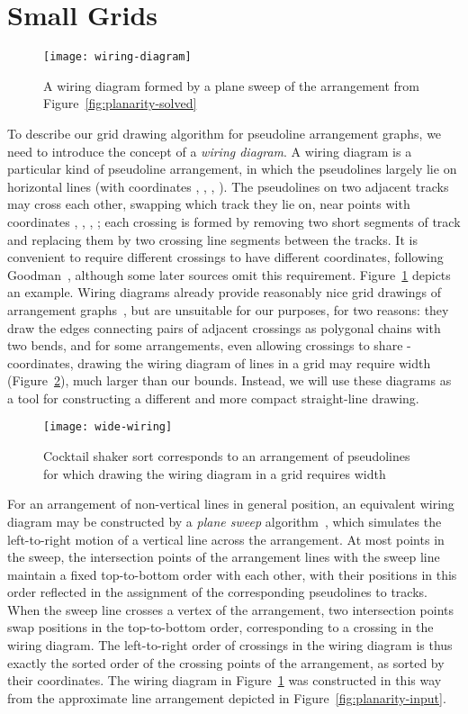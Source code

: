 \documentclass[oribibl]{llncs}
\begin{document}
\section{Small Grids}
\label{sec:grid}

\begin{figure}[b]
\centering\texttt{[image: wiring-diagram]}
\caption{A wiring diagram formed by a plane sweep of the arrangement from Figure~\ref{fig:planarity-solved}}
\label{fig:wiring-diagram}
\end{figure}

To describe our grid drawing algorithm for pseudoline arrangement graphs, we need to introduce the concept of a \emph{wiring diagram}. A wiring diagram is a particular kind of pseudoline arrangement, in which the  pseudolines largely lie on  horizontal lines (with coordinates , , , ).  The pseudolines on two adjacent tracks may cross each other, swapping which track they lie on, near points with coordinates , , , ; each crossing is formed by removing two short segments of track and replacing them by two crossing line segments between the tracks. It is convenient to require different crossings to have different  coordinates, following Goodman~\cite{Goo-DM-80}, although some later sources omit this requirement. Figure~\ref{fig:wiring-diagram} depicts an example. Wiring diagrams already provide reasonably nice grid drawings of arrangement graphs~\cite{MutSahPat-01}, but are unsuitable for our purposes, for two reasons: they draw the edges connecting pairs of adjacent crossings as polygonal chains with two bends, and for some arrangements,  even allowing crossings to share -coordinates, drawing the wiring diagram of  lines in a grid may require width  (Figure~\ref{fig:wide-wiring}), much larger than our bounds. Instead, we will use these diagrams as a tool for constructing a different and more compact straight-line drawing.

\begin{figure}[t]
\centering\texttt{[image: wide-wiring]}
\caption{Cocktail shaker sort corresponds to an arrangement of  pseudolines for which drawing the wiring diagram in a grid requires width }
\label{fig:wide-wiring}
\end{figure}

For an arrangement of non-vertical lines in general position, an equivalent wiring diagram may be constructed by a \emph{plane sweep} algorithm~\cite{BenOtt-IEEETC-79}, which simulates the left-to-right motion of a vertical line across the arrangement. At most points in the sweep, the intersection points of the arrangement lines with the sweep line maintain a fixed top-to-bottom order with each other, with their positions in this order reflected in the assignment of the corresponding pseudolines to tracks. When the sweep line crosses a vertex of the arrangement, two intersection points swap positions in the top-to-bottom order, corresponding to a crossing in the wiring diagram. The left-to-right order of crossings in the wiring diagram is thus exactly the sorted order of the crossing points of the arrangement, as sorted by their  coordinates. The wiring diagram in Figure~\ref{fig:wiring-diagram} was constructed in this way from the approximate line arrangement depicted in Figure~\ref{fig:planarity-input}.
\end{document}
